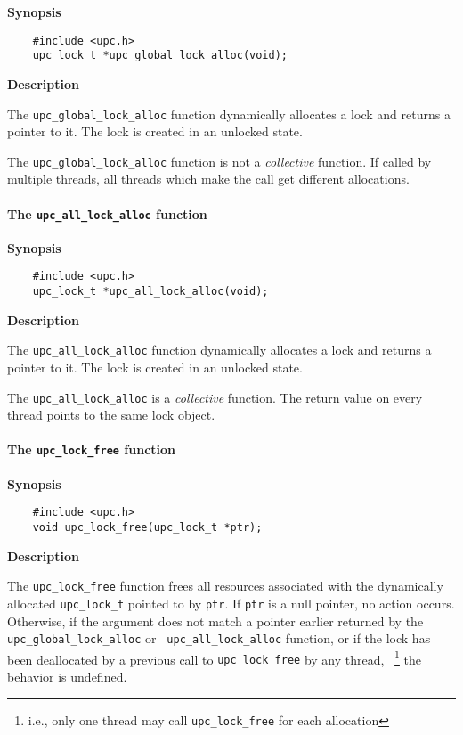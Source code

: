 {\bf Synopsis} 

\npf\vspace{-2.5em}
\begin{verbatim}
    #include <upc.h> 
    upc_lock_t *upc_global_lock_alloc(void); 
\end{verbatim}

{\bf Description}

\np The {\tt upc\_global\_lock\_alloc} function dynamically
    allocates a lock and returns a pointer to it.  The lock is created
    in an unlocked state.

\np The {\tt upc\_global\_lock\_alloc} function is not a {\em
    collective} function. If called by multiple threads,
    all threads which make the call get different allocations.
    
\paragraph{The {\tt upc\_all\_lock\_alloc} function}

{\bf Synopsis} 

\npf\vspace{-2.5em}
\begin{verbatim}
    #include <upc.h> 
    upc_lock_t *upc_all_lock_alloc(void); 
\end{verbatim}

{\bf Description}

\np The {\tt upc\_all\_lock\_alloc} function dynamically
    allocates a lock and returns a pointer to it. The lock is created
    in an unlocked state.

\np The {\tt upc\_all\_lock\_alloc} is a {\em collective}
    function.  The return value on every thread points to the same
    lock object.

\paragraph{The {\tt upc\_lock\_free} function}

{\bf Synopsis} 

\npf\vspace{-2.5em}
\begin{verbatim}
    #include <upc.h> 
    void upc_lock_free(upc_lock_t *ptr); 
\end{verbatim}

{\bf Description}

\np The {\tt upc\_lock\_free} function frees all resources
    associated with the dynamically allocated {\tt upc\_lock\_t} pointed to
    by {\tt ptr}.  If {\tt ptr} is a null pointer, no action occurs.
    Otherwise, if the argument does not match a pointer earlier
    returned by the {\tt upc\_global\_lock\_alloc} or {\tt
    upc\_all\_lock\_alloc} function, or if the lock has been
    deallocated by a previous call to {\tt upc\_lock\_free} by any thread,~%
    \footnote
    {i.e., only one thread may call {\tt upc\_lock\_free} for each
    allocation} 
    the behavior is undefined.

